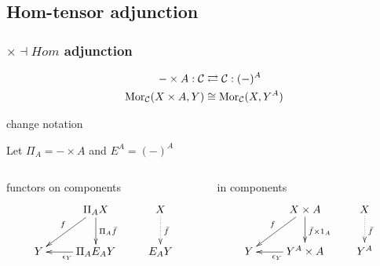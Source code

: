 \subsection{Hom-tensor adjunction}
\begin{frame}[t]
\frametitle{$\times \dashv Hom$ adjunction}
\begin{block}{}
\abovedisplayskip=0pt
\begin{align*}
- \times A: \mathcal{C} & \rightleftarrows \mathcal{C}: (-)^A\\
\mathop{\rm Mor}\nolimits_{\mathcal{C}}(X \times A, Y) & \cong  \mathop{\rm Mor}\nolimits_{\mathcal{C}}(X, Y^A)
\end{align*}
\end{block}
\begin{block}{change notation}
	\begin{center}
	Let $\Pi_A = - \times A$ and $E^A = (-)^A$
	\end{center}
\end{block}
\begin{columns}[t]
    \begin{column}{0.5\textwidth}
		\begin{block}{functors on components}
			$$
			\xymatrix{
			& \Pi_A X \ar[d]^{\Pi_A \bar{f}} \ar[dl]_{f} & X \ar@{.>}[d]^{\bar{f}}\\
			Y & \Pi_A E_A Y \ar[l]^{\epsilon_Y} & E_A Y}
			$$
		\end{block}		
    \end{column}
    \begin{column}{0.5\textwidth}
		\begin{block}{in components}
			$$
			\xymatrix{
			& X \times A \ar[d]^{\bar{f} \times 1_A} \ar[dl]_{f} & X \ar@{.>}[d]^{\bar{f}}\\
			Y & Y^A \times A \ar[l]^{\epsilon_Y} & Y^A}
			$$
		\end{block}
    \end{column}
\end{columns}
\end{frame}

